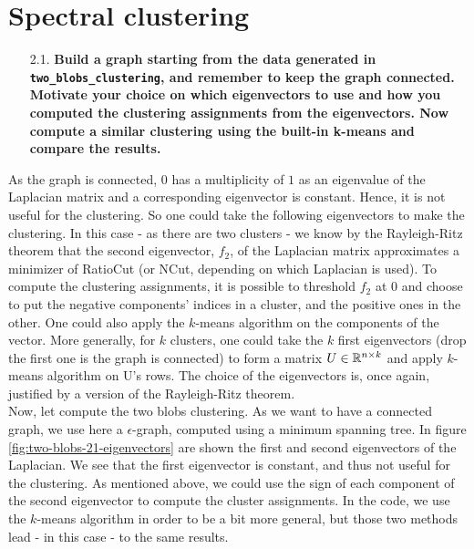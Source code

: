 \documentclass[a4paper, 11pt]{article}
\begin{document}
\section{Spectral clustering}



\begin{itemize}
    \item[2.1.] \textbf{Build a graph starting from the data generated in \texttt{two\_blobs\_clustering}, and remember to keep the graph connected. Motivate your choice on which eigenvectors to use and how you computed the clustering assignments from the eigenvectors. Now compute a similar clustering using the built-in k-means and compare the results.}
\end{itemize}
    
    As the graph is connected, $0$ has a multiplicity of $1$ as an eigenvalue of the Laplacian matrix and a corresponding eigenvector is constant. Hence, it is not useful for the clustering. So one could take the following eigenvectors to make the clustering. In this case - as there are two clusters - we know by the Rayleigh-Ritz theorem that the second eigenvector, $f_{2}$, of the Laplacian matrix approximates a minimizer of RatioCut (or NCut, depending on which Laplacian is used). To compute the clustering assignments, it is possible to threshold $f_{2}$ at $0$ and choose to put the negative components' indices in a cluster, and the positive ones in the other. One could also apply the $k$-means algorithm on the components of the vector. More generally, for $k$ clusters, one could take the $k$ first eigenvectors (drop the first one is the graph is connected) to form a matrix $U \in \mathbb{R}^{n \times k}$ and apply $k$-means algorithm on U's rows. The choice of the eigenvectors is, once again, justified by a version of the Rayleigh-Ritz theorem. \\
    
    Now, let compute the two blobs clustering. As we want to have a connected graph, we use here a $\epsilon$-graph, computed using a minimum spanning tree. In figure \ref{fig:two-blobs-21-eigenvectors} are shown the first and second eigenvectors of the Laplacian. We see that the first eigenvector is constant, and thus not useful for the clustering. As mentioned above, we could use the sign of each component of the second eigenvector to compute the cluster assignments. In the code, we use the $k$-means algorithm in order to be a bit more general, but those two methods lead - in this case - to the same results.
\end{document}

